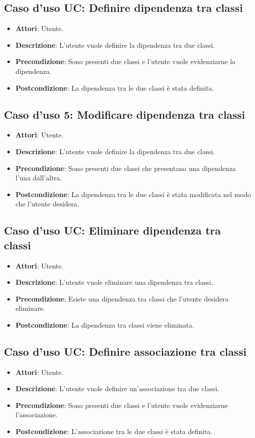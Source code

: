 \documentclass[../AnalisiDeiRequisiti.tex]{subfiles}
\begin{document}
		\subsection{Caso d'uso UC: Definire dipendenza tra classi}
		\begin{itemize}
			\item\textbf{Attori}: Utente.
			\item\textbf{Descrizione}: L'utente vuole definire la dipendenza tra due classi.
			\item\textbf{Precondizione}: Sono presenti due classi e l'utente vuole evidenziarne la dipendenza.
			\item\textbf{Postcondizione}: La dipendenza tra le due classi è stata definita.
		\end{itemize}
		
		\subsection{Caso d'uso 5: Modificare dipendenza tra classi}
		\begin{itemize}
			\item\textbf{Attori}: Utente.
			\item\textbf{Descrizione}: L'utente vuole definire la dipendenza tra due classi.
			\item\textbf{Precondizione}: Sono presenti due classi che presentano una dipendenza l'una dall'altra.
			\item\textbf{Postcondizione}: La dipendenza tra le due classi è stata modificata nel modo che l'utente desidera.
		\end{itemize}
		
		\subsection{Caso d'uso UC: Eliminare dipendenza tra classi}
		\begin{itemize}
			\item\textbf{Attori}: Utente.
			\item\textbf{Descrizione}: L'utente vuole eliminare una dipendenza tra classi.
			\item\textbf{Precondizione}: Esiste una dipendenza tra classi che l'utente desidera eliminare.
			\item\textbf{Postcondizione}: La dipendenza tra classi viene eliminata.
		\end{itemize}
		
		\subsection{Caso d'uso UC: Definire associazione tra classi}
		\begin{itemize}
			\item\textbf{Attori}: Utente.
			\item\textbf{Descrizione}: L'utente vuole definire un'associazione tra due classi.
			\item\textbf{Precondizione}: Sono presenti due classi e l'utente vuole evidenziarne l'associazione.
			\item\textbf{Postcondizione}: L'associazione tra le due classi è stata definita.
		\end{itemize}
		
\end{document}

